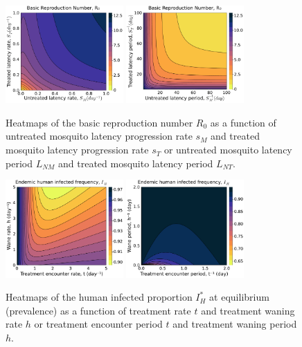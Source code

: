 \documentclass[11pt]{article}
\begin{document}
\begin{figure}[H]
  \centering
  \includegraphics[width=0.4\textwidth]{../../fig/brn_smxst_heatmap.pdf}
  \includegraphics[width=0.4\textwidth]{../../fig/brn_smxst_heatmap_rev.pdf}
  \caption{Heatmaps of the basic reproduction number $R_0$ as a function of untreated mosquito latency progression rate $s_M$ and treated mosquito latency progression rate $s_T$ or untreated mosquito latency period $L_{NM}$ and treated mosquito latency period $L_{NT}$.}
\end{figure}

\begin{figure}[H]
  \centering
  \includegraphics[width=0.4\textwidth]{../../fig/Ih_txh.pdf}
  \includegraphics[width=0.4\textwidth]{../../fig/Ih_txh_rev.pdf}
  \caption{Heatmaps of the human infected proportion $I_H^*$ at equilibrium (prevalence) as a function of treatment rate $t$ and treatment waning rate $h$ or treatment encounter period $t$ and treatment waning period $h$.}
\end{figure}
\end{document}
